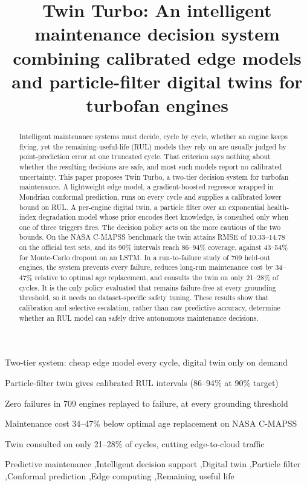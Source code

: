 \documentclass[preprint,12pt,authoryear]{elsarticle}
\begin{document}
\begin{frontmatter}

\title{Twin Turbo: An intelligent maintenance decision system combining calibrated edge models and particle-filter digital twins for turbofan engines}


\begin{abstract}
Intelligent maintenance systems must decide, cycle by cycle, whether an engine keeps flying, yet the remaining-useful-life (RUL) models they rely on are usually judged by point-prediction error at one truncated cycle. That criterion says nothing about whether the resulting decisions are safe, and most such models report no calibrated uncertainty. This paper proposes Twin Turbo, a two-tier decision system for turbofan maintenance. A lightweight edge model, a gradient-boosted regressor wrapped in Mondrian conformal prediction, runs on every cycle and supplies a calibrated lower bound on RUL. A per-engine digital twin, a particle filter over an exponential health-index degradation model whose prior encodes fleet knowledge, is consulted only when one of three triggers fires. The decision policy acts on the more cautious of the two bounds. On the NASA C-MAPSS benchmark the twin attains RMSE of 10.33--14.78 on the official test sets, and its 90\% intervals reach 86--94\% coverage, against 43--54\% for Monte-Carlo dropout on an LSTM. In a run-to-failure study of 709 held-out engines, the system prevents every failure, reduces long-run maintenance cost by 34--47\% relative to optimal age replacement, and consults the twin on only 21--28\% of cycles. It is the only policy evaluated that remains failure-free at every grounding threshold, so it needs no dataset-specific safety tuning. These results show that calibration and selective escalation, rather than raw predictive accuracy, determine whether an RUL model can safely drive autonomous maintenance decisions.
\end{abstract}

\begin{highlights}
\item Two-tier system: cheap edge model every cycle, digital twin only on demand
\item Particle-filter twin gives calibrated RUL intervals (86--94\% at 90\% target)
\item Zero failures in 709 engines replayed to failure, at every grounding threshold
\item Maintenance cost 34--47\% below optimal age replacement on NASA C-MAPSS
\item Twin consulted on only 21--28\% of cycles, cutting edge-to-cloud traffic
\end{highlights}

\begin{keyword}
Predictive maintenance \sep Intelligent decision support \sep Digital twin \sep Particle filter \sep Conformal prediction \sep Edge computing \sep Remaining useful life
\end{keyword}

\end{frontmatter}
\end{document}
